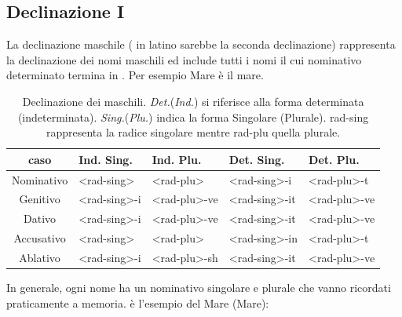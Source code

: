 \subsection{Declinazione I}

La declinazione maschile (\ie{} in latino sarebbe la seconda declinazione) rappresenta la declinazione dei nomi maschili ed include tutti i nomi il cui nominativo determinato termina in . Per esempio \glsdesc{Mare} è il mare.

\begin{table}[H]
    \centering
    \begin{tabular}{cllll}
        \toprule
        caso        & Ind. Sing.         & Ind. Plu.        & Det. Sing.      & Det. Plu. \\
        \midrule
        Nominativo  & <rad-sing>         & <rad-plu>        & <rad-sing>-i    & <rad-plu>-t  \\
        Genitivo    & <rad-sing>-i       & <rad-plu>-ve     & <rad-sing>-it   & <rad-plu>-ve \\
        Dativo      & <rad-sing>-i       & <rad-plu>-ve     & <rad-sing>-it   & <rad-plu>-ve \\
        Accusativo  & <rad-sing>         & <rad-plu>        & <rad-sing>-in   & <rad-plu>-t \\
        Ablativo    & <rad-sing>-i       & <rad-plu>-sh     & <rad-sing>-it   & <rad-plu>-ve \\
        \bottomrule
    \end{tabular}
    \caption{Declinazione dei maschili. \textit{Det.}(\textit{Ind.}) si riferisce alla forma determinata (indeterminata). \textit{Sing.}(\textit{Plu.}) indica la forma Singolare (Plurale). rad-sing rappresenta la radice singolare mentre rad-plu quella plurale.}
    \label{decl:1:generale}
\end{table}

In generale, ogni nome ha un nominativo singolare e plurale che vanno ricordati praticamente a memoria.  è l'esempio del Mare (\glsdesc{Mare}):

